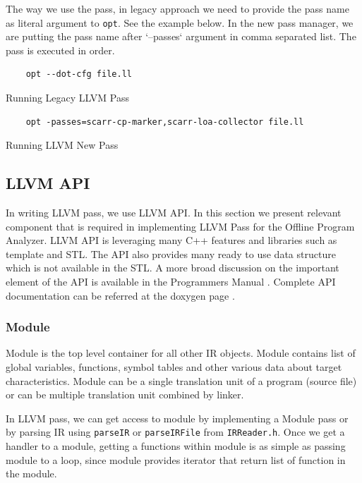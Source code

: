 The way we use the pass, in legacy approach we need to provide the pass name as literal argument to \texttt{opt}. See the example below. In the new pass manager, we are putting the pass name after `--passes` argument in comma separated list. The pass is executed in order.

\begin{listing}
\begin{verbatim}
    opt --dot-cfg file.ll 
\end{verbatim}
\caption{Running Legacy LLVM Pass}    
\label{listing:2-3}
\end{listing}

\begin{listing}
\begin{verbatim}
    opt -passes=scarr-cp-marker,scarr-loa-collector file.ll 
\end{verbatim}
\caption{Running LLVM New Pass}    
\label{listing:2-4}
\end{listing}

\subsection{LLVM API}

In writing LLVM pass, we use LLVM API. In this section we present relevant component that is required in implementing LLVM Pass for the Offline Program Analyzer. LLVM API is leveraging many C++ features and libraries such as template and STL. The API also provides many ready to use data structure which is not available in the STL. A more broad discussion on the important element of the API is available in the Programmers Manual \cite{LLVMProgrammerManuala}. Complete API documentation can be referred at the doxygen page \cite{LLVMLLVMa}.

\subsubsection{Module}

Module is the top level container for all other IR objects. Module contains list of global variables, functions, symbol tables and other various data about target characteristics. Module can be a single translation unit of a program (source file) or can be multiple translation unit combined by linker. 

In LLVM pass, we can get access to module by implementing a Module pass or by parsing IR using \texttt{parseIR} or \texttt{parseIRFile} from \texttt{IRReader.h}. Once we get a handler to a module, getting a functions within module is as simple as passing module to a loop, since module provides iterator that return list of function in the module.

